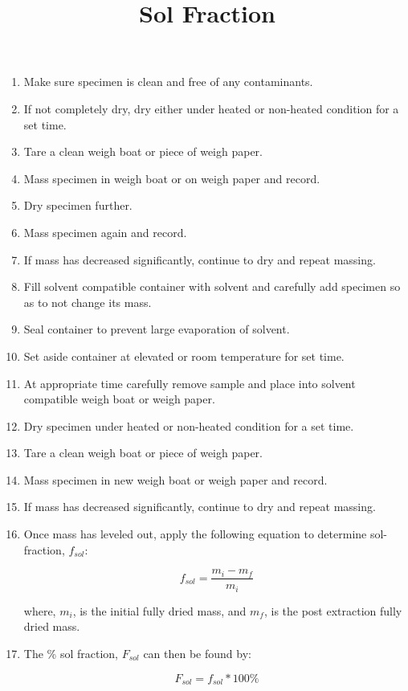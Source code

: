 \documentclass[11pt, oneside]{article}   	%
\title{Sol Fraction}
\begin{document}
\maketitle 							%
\date{}							%

\begin{enumerate}

\item Make sure specimen is clean and free of any contaminants.
\item If not completely dry, dry either under heated or non-heated condition for a set time.
\item Tare a clean weigh boat or piece of weigh paper.
\item Mass specimen in weigh boat or on weigh paper and record.
\item Dry specimen further.
\item Mass specimen again and record.
\item If mass has decreased significantly, continue to dry and repeat massing.
\item Fill solvent compatible container with solvent and carefully add specimen so as to not change its mass.
\item Seal container to prevent large evaporation of solvent.
\item Set aside container at elevated or room temperature for set time.
\item At appropriate time carefully remove sample and place into solvent compatible weigh boat or weigh paper.
\item Dry specimen under heated or non-heated condition for a set time.
\item Tare a clean weigh boat or piece of weigh paper.
\item Mass specimen in new weigh boat or weigh paper and record.
\item If mass has decreased significantly, continue to dry and repeat massing.
\item Once mass has leveled out, apply the following equation to determine sol-fraction, $f_{sol}$:

    \begin{equation}
    	f_{sol} = \frac{m_{i} - m_{f}}{m_{i}}
    \end{equation}
    
    \noindent
    where, $m_{i}$, is the initial fully dried mass, and $m_{f}$, is the post extraction fully dried mass.  
    
\item The \% sol fraction, $F_{sol}$ can then be found by:

    \begin{equation}
    	F_{sol} = f_{sol}*100\%
    \end{equation}

\end{enumerate}
\end{document}
